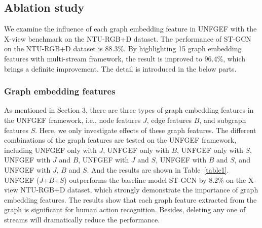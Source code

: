 \documentclass[journal]{IEEEtran}
\begin{document}
\subsection{Ablation study}

We examine the influence of each graph embedding feature in UNFGEF with the X-view benchmark on the NTU-RGB+D dataset. The performance of ST-GCN on the NTU-RGB+D dataset is 88.3\%. By highlighting 15 graph embedding features with multi-stream framework, the result is improved to 96.4\%, which brings a definite improvement. The detail is introduced in the below parts.

\subsubsection{Graph embedding features}

As mentioned in Section 3, there are three types of graph embedding features in the UNFGEF framework, i.e., node features $J$, edge features $B$, and subgraph features $S$. Here, we only investigate effects of these graph features. The different combinations of the graph features are tested on the UNFGEF framework, including UNFGEF only with $J$, UNFGEF only with $B$, UNFGEF only with $S$, UNFGEF with $J$ and $B$, UNFGEF with $J$ and $S$, UNFGEF with $B$ and $S$, and UNFGEF with $J$, $B$ and $S$. And the results are shown in Table~\ref{table1}. UNFGEF ($J$+$B$+$S$) outperforms the baseline model ST-GCN by 8.2\% on the X-view NTU-RGB+D dataset, which strongly demonstrate the importance of graph embedding features. The results show that each graph feature extracted from the graph is significant for human action recognition. Besides, deleting any one of streams will dramatically reduce the performance.
\end{document}
